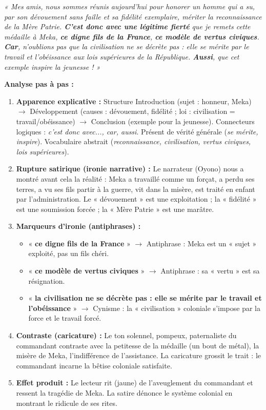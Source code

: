 \documentclass[11pt]{article}
\begin{document}
\begin{exemplebox}
\textit{« Mes amis, nous sommes réunis aujourd'hui pour honorer un homme qui a su, par son dévouement sans faille et sa fidélité exemplaire, mériter la reconnaissance de la Mère Patrie. \textbf{C'est donc avec une légitime fierté} que je remets cette médaille à Meka, \textbf{ce digne fils de la France}, \textbf{ce modèle de vertus civiques}. \textbf{Car}, n'oublions pas que la civilisation ne se décrète pas : elle se mérite par le travail et l'obéissance aux lois supérieures de la République. \textbf{Aussi}, que cet exemple inspire la jeunesse ! »}

\par\medskip\noindent\textbf{Analyse pas à pas :}
\begin{enumerate}
    \item \textbf{Apparence explicative :} Structure Introduction (sujet : honneur, Meka) $\rightarrow$ Développement (causes : dévouement, fidélité ; loi : civilisation = travail/obéissance) $\rightarrow$ Conclusion (exemple pour la jeunesse). Connecteurs logiques : \emph{c'est donc avec..., car, aussi}. Présent de vérité générale (\emph{se mérite, inspire}). Vocabulaire abstrait (\emph{reconnaissance, civilisation, vertus civiques, lois supérieures}).
    \item \textbf{Rupture satirique (ironie narrative) :} Le narrateur (Oyono) nous a montré avant cela la réalité : Meka a travaillé comme un forçat, a perdu ses terres, a vu ses fils partir à la guerre, vit dans la misère, est traité en enfant par l'administration. Le « dévouement » est une exploitation ; la « fidélité » est une soumission forcée ; la « Mère Patrie » est une marâtre.
    \item \textbf{Marqueurs d'ironie (antiphrases) :}
        \begin{itemize}
            \item « \textbf{ce digne fils de la France} » $\rightarrow$ Antiphrase : Meka est un « sujet » exploité, pas un fils chéri.
            \item « \textbf{ce modèle de vertus civiques} » $\rightarrow$ Antiphrase : sa « vertu » est sa résignation.
            \item « \textbf{la civilisation ne se décrète pas : elle se mérite par le travail et l'obéissance} » $\rightarrow$ Cynisme : la « civilisation » coloniale s'impose par la force et le travail forcé.
        \end{itemize}
    \item \textbf{Contraste (caricature) :} Le ton solennel, pompeux, paternaliste du commandant contraste avec la petitesse de la médaille (un bout de métal), la misère de Meka, l'indifférence de l'assistance. La caricature grossit le trait : le commandant incarne la bêtise coloniale satisfaite.
    \item \textbf{Effet produit :} Le lecteur rit (jaune) de l'aveuglement du commandant et ressent la tragédie de Meka. La satire dénonce le système colonial en montrant le ridicule de ses rites.
\end{enumerate}
\end{exemplebox}
\end{document}
